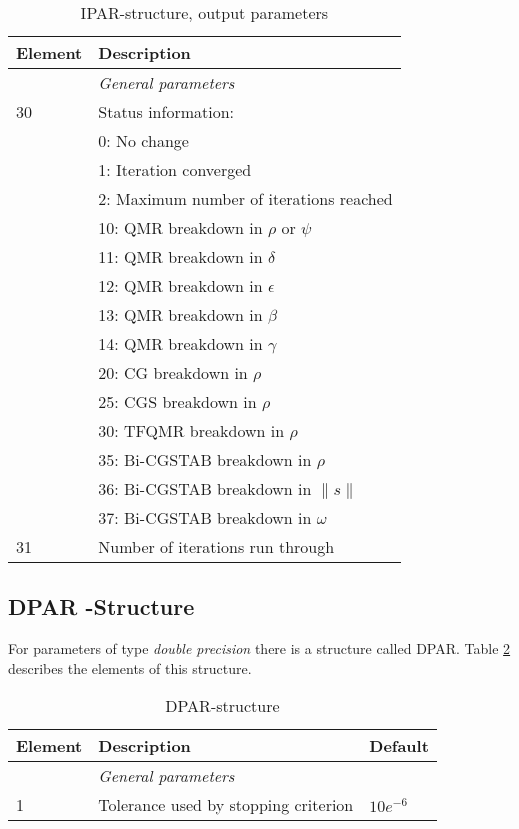 \documentclass[11pt,a4paper,english,oneside]{report}
\begin{document}
\begin{table}[H]

\begin{tabular*}{\textwidth}{ll}
\hline\hline
{\bfseries Element} & {\bfseries Description} \\
\hline\hline
	& {\em General parameters} \\
\hline
30 	& Status information: \\
	& 0: No change \\
	& 1: Iteration converged \\
	& 2: Maximum number of iterations reached \\
	& 10: QMR breakdown in $\rho$ or $\psi$ \\
	& 11: QMR breakdown in $\delta$ \\
	& 12: QMR breakdown in $\epsilon$ \\
	& 13: QMR breakdown in $\beta$ \\
	& 14: QMR breakdown in $\gamma$ \\
	& 20: CG breakdown in $\rho$ \\
	& 25: CGS breakdown in $\rho$ \\
	& 30: TFQMR breakdown in $\rho$ \\
	& 35: Bi-CGSTAB breakdown in $\rho$ \\
	& 36: Bi-CGSTAB breakdown in $\|s\|$ \\
	& 37: Bi-CGSTAB breakdown in $\omega$ \\
31 	& Number of iterations run through \\
\hline\hline
\end{tabular*}

\caption{IPAR-structure, output parameters}
\label{table:ipar-output}
\end{table}

\subsection{DPAR -Structure}
\label{sec:dpars}

For parameters of type {\em double precision} there is a structure
called {\ttfamily DPAR}. Table \ref{table:dpar} describes the
elements of this structure.

\begin{table}[h]
\begin{tabular*}{\textwidth}{lll}
\hline\hline
{\bfseries Element} & {\bfseries Description} & {\bfseries Default} \\
\hline\hline
	& {\em General parameters} & \\
\hline
1 	& Tolerance used by stopping criterion & $10e^{-6}$ \\
\hline\hline
\end{tabular*}
\caption{DPAR-structure}
\label{table:dpar}
\end{table}
\end{document}
